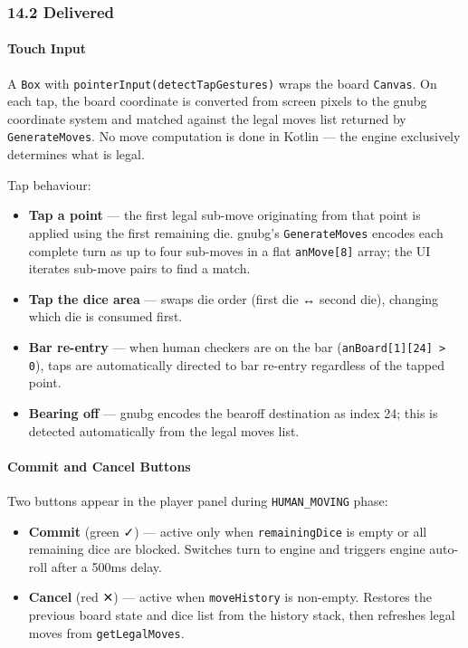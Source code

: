 \documentclass[11pt,a4paper]{article}
\providecommand{\tightlist}{\setlength{\itemsep}{2pt}\setlength{\parskip}{0pt}}
\begin{document}
\subsubsection{14.2 Delivered}\label{delivered-v094}

\paragraph{Touch Input}\label{touch-input-v094}

A \texttt{Box} with \texttt{pointerInput(detectTapGestures)} wraps the
board \texttt{Canvas}. On each tap, the board coordinate is converted
from screen pixels to the gnubg coordinate system and matched against
the legal moves list returned by \texttt{GenerateMoves}. No move
computation is done in Kotlin — the engine exclusively determines what
is legal.

Tap behaviour:

\begin{itemize}
\tightlist
\item
  \textbf{Tap a point} — the first legal sub-move originating from that
  point is applied using the first remaining die. gnubg's
  \texttt{GenerateMoves} encodes each complete turn as up to four
  sub-moves in a flat \texttt{anMove[8]} array; the UI iterates
  sub-move pairs to find a match.
\item
  \textbf{Tap the dice area} — swaps die order (first die ↔ second
  die), changing which die is consumed first.
\item
  \textbf{Bar re-entry} — when human checkers are on the bar
  (\texttt{anBoard[1][24] > 0}), taps are automatically directed to bar
  re-entry regardless of the tapped point.
\item
  \textbf{Bearing off} — gnubg encodes the bearoff destination as index
  24; this is detected automatically from the legal moves list.
\end{itemize}

\paragraph{Commit and Cancel
Buttons}\label{commit-cancel-v094}

Two buttons appear in the player panel during \texttt{HUMAN\_MOVING}
phase:

\begin{itemize}
\tightlist
\item
  \textbf{Commit} (green ✓) — active only when \texttt{remainingDice}
  is empty or all remaining dice are blocked. Switches turn to engine
  and triggers engine auto-roll after a 500ms delay.
\item
  \textbf{Cancel} (red ✕) — active when \texttt{moveHistory} is
  non-empty. Restores the previous board state and dice list from the
  history stack, then refreshes legal moves from \texttt{getLegalMoves}.
\end{itemize}
\end{document}
